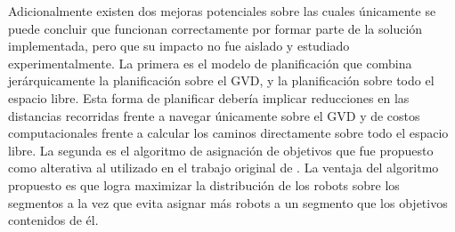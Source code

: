 Adicionalmente existen dos mejoras potenciales sobre las cuales únicamente se
puede concluir que funcionan correctamente por formar parte de la solución
implementada, pero que su impacto no fue aislado y estudiado experimentalmente.
La primera es el modelo de planificación que combina jerárquicamente la
planificación sobre el GVD, y la planificación sobre todo el espacio libre.
Esta forma de planificar debería implicar reducciones en las distancias
recorridas frente a navegar únicamente sobre el GVD y de costos computacionales
frente a calcular los caminos directamente sobre todo el espacio libre. La
segunda es el algoritmo de asignación de objetivos que fue propuesto como
alterativa al utilizado en el trabajo original de \cite{wurm2008coordinated}.
La ventaja del algoritmo propuesto es que logra maximizar la distribución de
los robots sobre los segmentos a la vez que evita asignar más robots a un
segmento que los objetivos contenidos de él.















